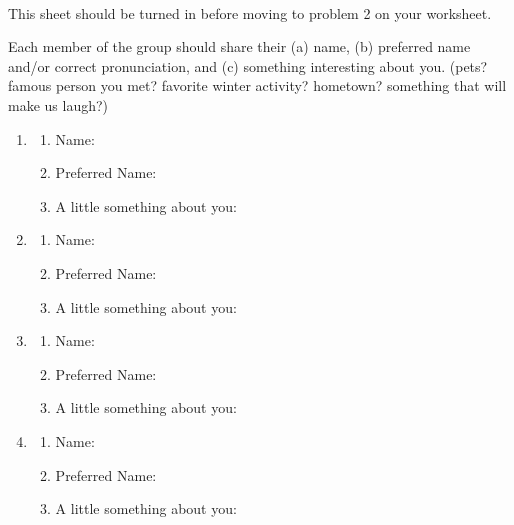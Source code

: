 \documentclass[11pt,fleqn]{article}
\begin{document}
\renewcommand{\headrulewidth}{0pt}
\newcommand{\blank}[1]{\rule{#1}{0.75pt}}
\newcommand{\bc}{\begin{center}}
\newcommand{\ec}{\end{center}}
\renewcommand{\d}{\displaystyle}

\vspace*{-0.7in}

\begin{center}
  \large
  \\
  
\end{center}

{\Large{This sheet should be turned in before moving to problem 2 on your worksheet.}}

Each member of the group should share their (a) name, (b) preferred name and/or correct pronunciation, and (c) something interesting about you. (pets? famous person you met? favorite winter activity? hometown? something that will make us laugh?)\\

\begin{enumerate}
\item 
	\begin{enumerate}
	\item Name: 
	\item Preferred Name:
	\item A little something about you:
	\end{enumerate}
\vfill
\item 
	\begin{enumerate}
	\item Name: 
	\item Preferred Name:
	\item A little something about you:
	\end{enumerate}
\vfill
\item 
	\begin{enumerate}
	\item Name: 
	\item Preferred Name:
	\item A little something about you:
	\end{enumerate}
\vfill
\item 
	\begin{enumerate}
	\item Name: 
	\item Preferred Name:
	\item A little something about you:
	\end{enumerate}
\end{enumerate}
\end{document}
